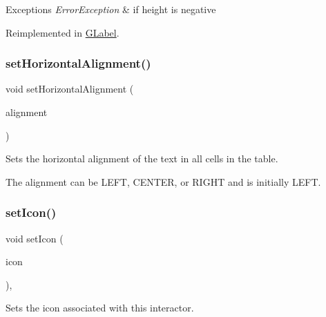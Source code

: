 \begin{DoxyExceptions}{Exceptions}
{\em Error\+Exception} & if height is negative \\
\hline
\end{DoxyExceptions}


Reimplemented in \mbox{\hyperlink{classGLabel_a5eead864d1249c4406f32f9944ed1503}{G\+Label}}.

\mbox{\label{classGTable_a04e6ce745dd0f9708f14dedc68ec8b18}} 
\subsubsection{\texorpdfstring{set\+Horizontal\+Alignment()}{setHorizontalAlignment()}}
{\footnotesize\ttfamily void set\+Horizontal\+Alignment (\begin{DoxyParamCaption}\item[{Horizontal\+Alignment}]{alignment }\end{DoxyParamCaption})\hspace{0.3cm}{\ttfamily [virtual]}}



Sets the horizontal alignment of the text in all cells in the table. 

The alignment can be L\+E\+FT, C\+E\+N\+T\+ER, or R\+I\+G\+HT and is initially L\+E\+FT. \mbox{\label{classGInteractor_a542abfcd7261751352af129c7215ecda}} 
\subsubsection{\texorpdfstring{set\+Icon()}{setIcon()}\hspace{0.1cm}{\footnotesize\ttfamily [1/3]}}
{\footnotesize\ttfamily void set\+Icon (\begin{DoxyParamCaption}\item[{const Q\+Icon \&}]{icon }\end{DoxyParamCaption})\hspace{0.3cm}{\ttfamily [virtual]}, {\ttfamily [inherited]}}



Sets the icon associated with this interactor. 

